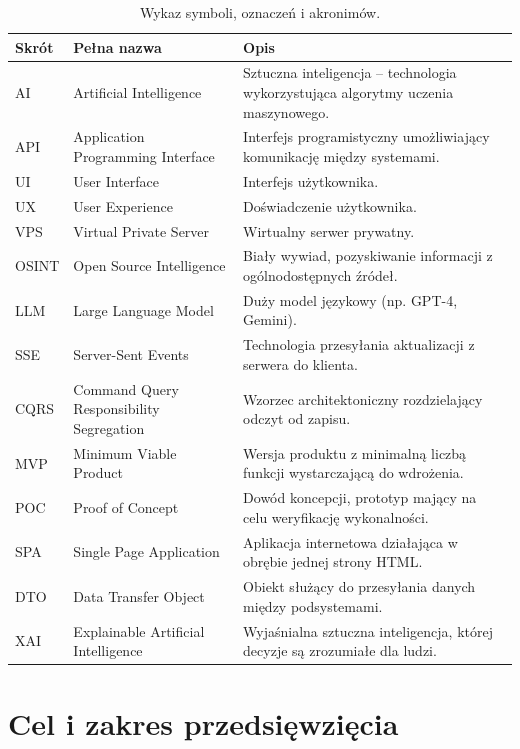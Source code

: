 \documentclass[12pt,a4paper]{article}
\begin{document}
\begin{table}[h]
\centering
\begin{tabular}{|p{}|p{}|p{}|}
\hline
\textbf{Skrót} & \textbf{Pełna nazwa} & \textbf{Opis} \\
\hline
AI & Artificial Intelligence & Sztuczna inteligencja – technologia wykorzystująca algorytmy uczenia maszynowego. \\
\hline
API & Application Programming Interface & Interfejs programistyczny umożliwiający komunikację między systemami. \\
\hline
UI & User Interface & Interfejs użytkownika. \\
\hline
UX & User Experience & Doświadczenie użytkownika. \\
\hline
VPS & Virtual Private Server & Wirtualny serwer prywatny. \\
\hline
OSINT & Open Source Intelligence & Biały wywiad, pozyskiwanie informacji z ogólnodostępnych źródeł. \\
\hline
LLM & Large Language Model & Duży model językowy (np. GPT-4, Gemini). \\
\hline
SSE & Server-Sent Events & Technologia przesyłania aktualizacji z serwera do klienta. \\
\hline
CQRS & Command Query Responsibility Segregation & Wzorzec architektoniczny rozdzielający odczyt od zapisu. \\
\hline
MVP & Minimum Viable Product & Wersja produktu z minimalną liczbą funkcji wystarczającą do wdrożenia. \\
\hline
POC & Proof of Concept & Dowód koncepcji, prototyp mający na celu weryfikację wykonalności. \\
\hline
SPA & Single Page Application & Aplikacja internetowa działająca w obrębie jednej strony HTML. \\
\hline
DTO & Data Transfer Object & Obiekt służący do przesyłania danych między podsystemami. \\
\hline
XAI & Explainable Artificial Intelligence & Wyjaśnialna sztuczna inteligencja, której decyzje są zrozumiałe dla ludzi. \\
\hline
\end{tabular}
\caption{Wykaz symboli, oznaczeń i akronimów.}
\label{tab:acronyms}
\end{table}

\section{Cel i zakres przedsięwzięcia}
\end{document}

